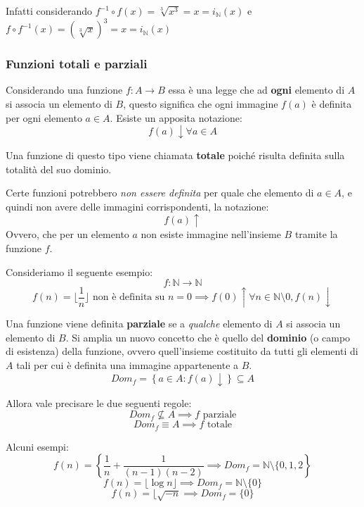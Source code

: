 \documentclass{article}
\begin{document}
Infatti considerando $f^{-1}\circ f(x) = \sqrt[3]{x^3}=x=i_\mathbb{N}(x)$ e $f\circ f^{-1}(x)=(\sqrt[3]{x})^3=x=i_\mathbb{N}(x)$

\subsubsection{Funzioni totali e parziali}
Considerando una funzione $f:A\rightarrow B$ essa è una legge che ad \textbf{ogni} elemento di $A$ si associa
un elemento di $B$, questo significa che ogni immagine $f(a)$ è definita per ogni elemento $a\in A$. Esiste
un apposita notazione:
$$f(a)\downarrow \forall a\in A$$

Una funzione di questo tipo viene chiamata \textbf{totale} poiché risulta definita sulla totalità del suo dominio.

Certe funzioni potrebbero \textit{non essere definita} per quale che elemento di $a\in A$, e quindi non avere delle immagini corrispondenti, la notazione:
$$f(a)\uparrow$$
Ovvero, che per un elemento $a$ non esiste immagine nell'insieme $B$ tramite la funzione $f$.

Consideriamo il seguente esempio:
$$f:\mathbb{N}\rightarrow\mathbb{N}$$
$$f(n)=\lfloor\frac{1}{n}\rfloor \text{ non è definita su } n=0\implies f(0)\uparrow \forall n\in\mathbb{N}\setminus{0}, f(n)\downarrow$$

Una funzione viene definita \textbf{parziale} se a \textit{qualche} elemento di $A$ si associa un elemento di $B$. Si amplia un nuovo concetto che è quello del \textbf{dominio} (o campo di esistenza) della funzione,
ovvero quell'insieme costituito da tutti gli elementi di $A$ tali per cui è definita una immagine appartenente a $B$.
$$Dom_f=\left\{a\in A : f(a)\downarrow \right\}\subseteq A$$

Allora vale precisare le due seguenti regole:
$$Dom_f\nsubseteq A\implies f\text{ parziale}$$
$$Dom_f\equiv A\implies f \text{ totale}$$

Alcuni esempi:
$$f(n)=\left\{\frac{1}{n}+\frac{1}{(n-1)(n-2)}\implies Dom_f=\mathbb{N}\setminus\{0,1,2\right\}$$
$$f(n)=\lfloor\log{n}\rfloor\implies Dom_f=\mathbb{N}\setminus\{0\}$$
$$f(n)=\lfloor\sqrt{-n} \implies Dom_f=\{0\}$$
\end{document}
